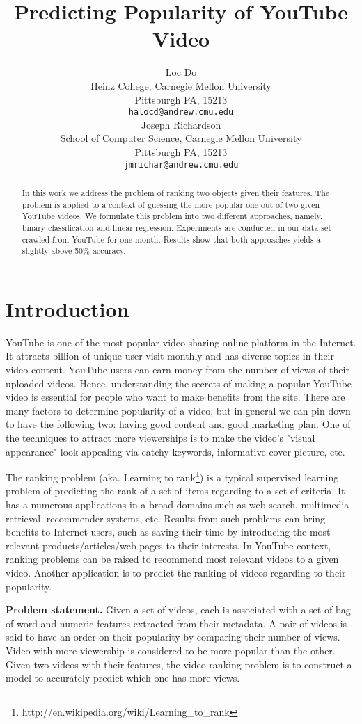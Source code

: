 \documentclass{article} %
\title{Predicting Popularity of YouTube Video}
\author{
Loc Do \\
Heinz College,
Carnegie Mellon University \\
Pittsburgh PA, 15213\\
\texttt{halocd@andrew.cmu.edu} \\
\And
Joseph Richardson \\
School of Computer Science,
Carnegie Mellon University \\
Pittsburgh PA, 15213 \\
\texttt{jmrichar@andrew.cmu.edu} \\
}
\begin{document}
\maketitle

\begin{abstract}
	In this work we address the problem of ranking two objects given their features. The problem is applied to a context of guessing the more popular one out of two given YouTube videos. We formulate this problem into two different approaches, namely, binary classification and linear regression. Experiments are conducted in our data set crawled from YouTube for one month. Results show that both approaches yields a slightly above 50\% accuracy.
\end{abstract}

\section{Introduction}
\label{sec:intro}
	YouTube is one of the most popular video-sharing online platform in the Internet. It attracts billion of unique user visit monthly and has diverse topics in their video content. YouTube users can earn money from the number of views of their uploaded videos. Hence, understanding the secrets of making a popular YouTube video is essential for people who want to make benefits from the site. There are many factors to determine popularity of a video, but in general we can pin down to have the following two: having good content and good marketing plan. One of the techniques to attract more viewerships is to make the video's "visual appearance" look appealing via catchy keywords, informative cover picture, etc.

	The ranking problem (aka. Learning to rank\footnote{http://en.wikipedia.org/wiki/Learning\_to\_rank}) is a typical supervised learning problem of predicting the rank of a set of items regarding to a set of criteria. It has a numerous applications in a broad domains such as web search, multimedia retrieval, recommender systems, etc. Results from such problems can bring benefits to Internet users, such as saving their time by introducing the most relevant products/articles/web pages to their interests. In YouTube context, ranking problems can be raised to recommend most relevant videos to a given video. Another application is to predict the ranking of videos regarding to their popularity.

	\textbf{Problem statement.} Given a set of videos, each is associated with a set of bag-of-word and numeric features extracted from their metadata. A pair of videos is said to have an order on their popularity by comparing their number of views. Video with more viewership is considered to be more popular than the other. Given two videos with their features, the video ranking problem is to construct a model to accurately predict which one has more views.
\end{document}

